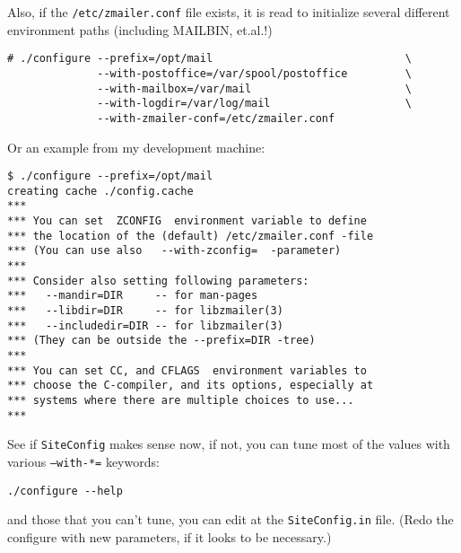 Also, if the {\tt /etc/zmailer.conf} file exists, it is read
to initialize several different environment paths (including
MAILBIN, et.al.!)
\begin{tscreen}
\begin{verbatim}
# ./configure --prefix=/opt/mail                              \
              --with-postoffice=/var/spool/postoffice         \
              --with-mailbox=/var/mail                        \
              --with-logdir=/var/log/mail                     \
              --with-zmailer-conf=/etc/zmailer.conf
\end{verbatim}
\end{tscreen}

Or an example from my development machine:
\begin{tscreen}
\begin{verbatim}
$ ./configure --prefix=/opt/mail
creating cache ./config.cache
***
*** You can set  ZCONFIG  environment variable to define
*** the location of the (default) /etc/zmailer.conf -file
*** (You can use also   --with-zconfig=  -parameter)
***
*** Consider also setting following parameters:
***   --mandir=DIR     -- for man-pages
***   --libdir=DIR     -- for libzmailer(3)
***   --includedir=DIR -- for libzmailer(3)
*** (They can be outside the --prefix=DIR -tree)
***
*** You can set CC, and CFLAGS  environment variables to
*** choose the C-compiler, and its options, especially at
*** systems where there are multiple choices to use...
***
\end{verbatim}
\end{tscreen}

See if {\tt SiteConfig} makes sense now, if not, you can tune
most of the values with various {\tt --with-*=} keywords:
\begin{tscreen}
\begin{verbatim}
./configure --help
\end{verbatim}
\end{tscreen}

and those that you can't tune, you can edit at the {\tt SiteConfig.in}
file.  (Redo the configure with new parameters, if it looks to be
necessary.)

